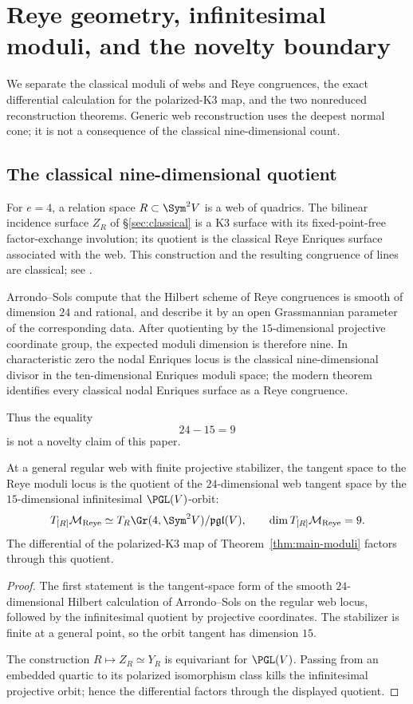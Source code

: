 \section{Reye geometry, infinitesimal moduli, and the novelty boundary}
\label{sec:reye-priority}

We separate the classical moduli of webs and Reye congruences, the
exact differential calculation for the polarized-K3 map, and the two
nonreduced reconstruction theorems.  Generic web reconstruction uses
the deepest normal cone; it is not a consequence of the classical
nine-dimensional count.

\subsection{The classical nine-dimensional quotient}

For $e=4$, a relation space $R\subset\Sym^2V$ is a web of quadrics.
The bilinear incidence surface $Z_R$ of
\S\ref{sec:classical} is a K3 surface with its fixed-point-free
factor-exchange involution; its quotient is the classical Reye
Enriques surface associated with the web.  This construction and the
resulting congruence of lines are classical; see
\cite{Cossec,ArrondoSols,DolgachevReider,IK,DK,MMV}.

Arrondo--Sols compute that the Hilbert scheme of Reye congruences is
smooth of dimension $24$ and rational, and describe it by an open
Grassmannian parameter of the corresponding data.  After quotienting
by the $15$-dimensional projective coordinate group, the expected
moduli dimension is therefore nine.  In characteristic zero the
nodal Enriques locus is the classical nine-dimensional divisor in the
ten-dimensional Enriques moduli space; the modern theorem
\cite{MMV} identifies every classical nodal Enriques surface as a
Reye congruence.

Thus the equality
\[
 24-15=9
\]
is not a novelty claim of this paper.

\begin{proposition}
\label{prop:reye-tangent}
At a general regular web with finite projective stabilizer, the tangent
space to the Reye moduli locus is the quotient of the $24$-dimensional
web tangent space by the $15$-dimensional infinitesimal
$\PGL(V)$-orbit:
\[
 T_{[R]}\mathcal M_{\mathrm{Reye}}
 \simeq
 T_R\Gr(4,\Sym^2V)/\mathfrak{pgl}(V),
 \qquad
 \dim T_{[R]}\mathcal M_{\mathrm{Reye}}=9.
\]
The differential of the polarized-K3 map of
Theorem~\ref{thm:main-moduli} factors through this quotient.
\end{proposition}
\begin{proof}
The first statement is the tangent-space form of the smooth
$24$-dimensional Hilbert calculation of Arrondo--Sols on the regular
web locus, followed by the infinitesimal quotient by projective
coordinates.  The stabilizer is finite at a general point, so the
orbit tangent has dimension $15$.

The construction $R\mapsto Z_R\simeq Y_R$ is equivariant for
$\PGL(V)$.  Passing from an embedded quartic to its polarized
isomorphism class kills the infinitesimal projective orbit; hence the
differential factors through the displayed quotient.
\end{proof}



